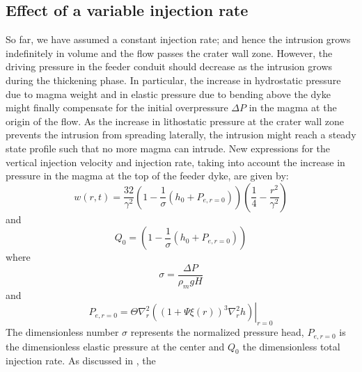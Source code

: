 \begin{article}
        \subsection{Effect of a variable injection rate}
        \label{Injection_Rate}
	 
        So far, we  have assumed a constant injection  rate; and hence
        the intrusion grows indefinitely in volume and the flow passes
        the crater  wall zone.  However, the  driving pressure  in the
        feeder conduit  should decrease as the  intrusion grows during
        the  thickening   phase.  In   particular,  the   increase  in
        hydrostatic  pressure  due  to  magma weight  and  in  elastic
        pressure  due   to  bending  above  the   dyke  might  finally
        compensate  for the  initial  overpressure $\Delta  P$ in  the
        magma  at  the  origin  of   the  flow.  As  the  increase  in
        lithostatic  pressure at  the  crater wall  zone prevents  the
        intrusion from spreading laterally,  the intrusion might reach
        a  steady   state  profile  such   that  no  more   magma  can
        intrude. New  expressions for the vertical  injection velocity
        and  injection  rate,  taking  into account  the  increase  in
        pressure in the magma at the top of the feeder dyke, are given
        by:
        \begin{equation}
          w(r,t)=\frac{32}{\gamma^{2}} \left(1-\frac{1}{\sigma}\left(h_0+P_{e,r=0} \right)\right)
          \left(\frac{1}{4}-\frac{r^{2}}{\gamma^{2}}\right)
          \label{5.3}
        \end{equation}
        and
        \begin{equation}
          Q_{0}=\left(1-\frac{1}{\sigma}\left(h_0+ P_{e,r=0}\right)\right)
          \label{eq5.4}
        \end{equation}
        where
        \begin{equation}
          \sigma=\frac{\Delta P}{\rho_{m}gH}
          \label{eq5.4.5}
        \end{equation}
        and
        \begin{equation}
          P_{e,r=0}= \Theta \nabla^{2}_{r}\left.\left ((1+\Psi \xi(r))^{3}\nabla^{2}_{r}h \right )\right|_{r=0}
        \end{equation}
        The  dimensionless number  $\sigma$ represents  the normalized
        pressure  head,  $P_{e,r=0}$   is  the  dimensionless  elastic
        pressure  at the  center and  $Q_{0}$ the  dimensionless total
        injection  rate.  As  discussed  in  \citet{Michaut2011},  the

\end{article}
